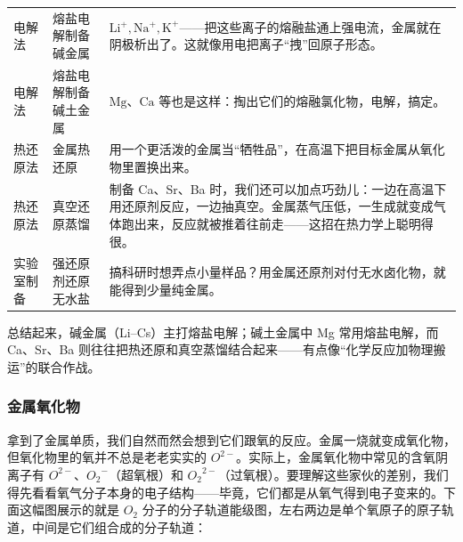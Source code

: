 \documentclass[UTF8]{ctexbook}
\begin{document}
\noindent
\begin{tabular*}{\textwidth}{@{\extracolsep{\fill}}llp{}@{}}
\midrule
电解法 & 熔盐电解制备碱金属 &  $\mathrm{Li^+,Na^+,K^+}$——把这些离子的熔融盐通上强电流，金属就在阴极析出了。这就像用电把离子“拽”回原子形态。 \\
电解法 & 熔盐电解制备碱土金属 & $\mathrm{Mg}$、$\mathrm{Ca}$ 等也是这样：掏出它们的熔融氯化物，电解，搞定。 \\
\midrule
热还原法 & 金属热还原 & 用一个更活泼的金属当“牺牲品”，在高温下把目标金属从氧化物里置换出来。\\
热还原法 & 真空还原蒸馏 & 制备 Ca、Sr、Ba 时，我们还可以加点巧劲儿：一边在高温下用还原剂反应，一边抽真空。金属蒸气压低，一生成就变成气体跑出来，反应就被推着往前走——这招在热力学上聪明得很。\\
\midrule
实验室制备 & 强还原剂还原无水盐 & 搞科研时想弄点小量样品？用金属还原剂对付无水卤化物，就能得到少量纯金属。\\
\bottomrule
\end{tabular*}
\renewcommand{\arraystretch}{1.0}

总结起来，碱金属（Li--Cs）主打熔盐电解；碱土金属中 Mg 常用熔盐电解，而 Ca、Sr、Ba 则往往把热还原和真空蒸馏结合起来——有点像“化学反应加物理搬运”的联合作战。

\subsubsection{金属氧化物}

拿到了金属单质，我们自然而然会想到它们跟氧的反应。金属一烧就变成氧化物，但氧化物里的氧并不总是老老实实的 $O^{2-}$。实际上，金属氧化物中常见的含氧阴离子有 $O^{2-}$、${O_2}^{-}$（超氧根）和 ${O_2}^{2-}$（过氧根）。要理解这些家伙的差别，我们得先看看氧气分子本身的电子结构——毕竟，它们都是从氧气得到电子变来的。下面这幅图展示的就是 $O_2$ 分子的分子轨道能级图，左右两边是单个氧原子的原子轨道，中间是它们组合成的分子轨道：
\end{document}
